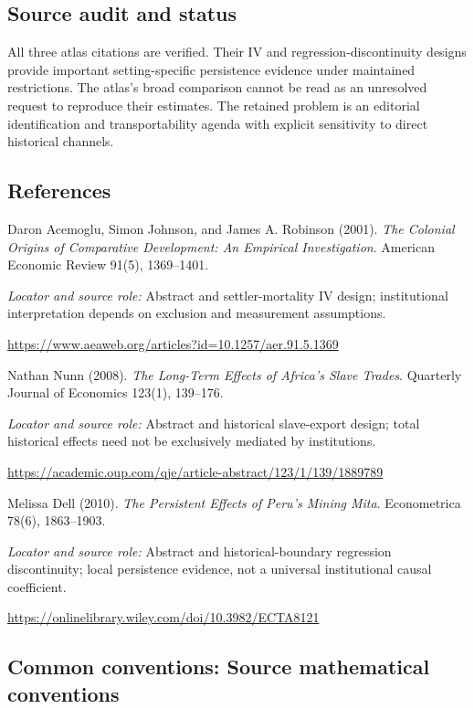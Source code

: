 \documentclass[11pt,a4paper]{article}
\begin{document}
\subsection*{Source audit and status}
All three atlas citations are verified. Their IV and regression-discontinuity designs provide important setting-specific persistence evidence under maintained restrictions. The atlas's broad comparison cannot be read as an unresolved request to reproduce their estimates. The retained problem is an editorial identification and transportability agenda with explicit sensitivity to direct historical channels.
\subsection*{References}
{\footnotesize\raggedright
\begin{enumerate}[label={\textbf{[S\arabic*]}},leftmargin=3em]
\item Daron Acemoglu, Simon Johnson, and James A. Robinson (2001). \emph{The Colonial Origins of Comparative Development: An Empirical Investigation}. American Economic Review 91(5), 1369--1401.\par
\textit{Locator and source role:} Abstract and settler-mortality IV design; institutional interpretation depends on exclusion and measurement assumptions.\par
\url{https://www.aeaweb.org/articles?id=10.1257/aer.91.5.1369}
\item Nathan Nunn (2008). \emph{The Long-Term Effects of Africa's Slave Trades}. Quarterly Journal of Economics 123(1), 139--176.\par
\textit{Locator and source role:} Abstract and historical slave-export design; total historical effects need not be exclusively mediated by institutions.\par
\url{https://academic.oup.com/qje/article-abstract/123/1/139/1889789}
\item Melissa Dell (2010). \emph{The Persistent Effects of Peru's Mining Mita}. Econometrica 78(6), 1863--1903.\par
\textit{Locator and source role:} Abstract and historical-boundary regression discontinuity; local persistence evidence, not a universal institutional causal coefficient.\par
\url{https://onlinelibrary.wiley.com/doi/10.3982/ECTA8121}
\end{enumerate}
}

\subsection*{Common conventions: Source mathematical conventions}
\end{document}
